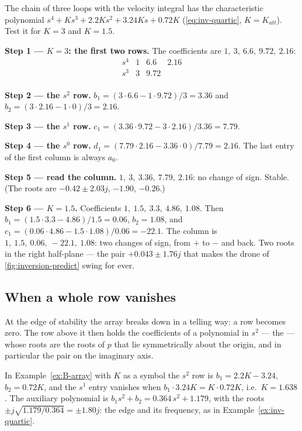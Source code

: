 \begin{example}
\label{ex:B-array}
The chain of three loops with the velocity integral has the characteristic polynomial $s^4 + K s^3 + 2.2K s^2 + 3.24K s + 0.72K$ (\cref{eq:inv-quartic}, $K = K_{att}$). Test it for $K = 3$ and $K = 1.5$.

\textbf{Step 1 — $K = 3$: the first two rows.} The coefficients are $1,\ 3,\ 6.6,\ 9.72,\ 2.16$:
\begin{equation*}
\begin{array}{c|ccc}
  s^4 & 1 & 6.6 & 2.16\\
  s^3 & 3 & 9.72 & \\
\end{array}
\end{equation*}

\textbf{Step 2 — the $s^2$ row.} $b_1 = (3 \cdot 6.6 - 1 \cdot 9.72)/3 = 3.36$ and $b_2 = (3 \cdot 2.16 - 1 \cdot 0)/3 = 2.16$.

\textbf{Step 3 — the $s^1$ row.} $c_1 = (3.36 \cdot 9.72 - 3 \cdot 2.16)/3.36 = 7.79$.

\textbf{Step 4 — the $s^0$ row.} $d_1 = (7.79 \cdot 2.16 - 3.36 \cdot 0)/7.79 = 2.16$. The last entry of the first column is always $a_0$.

\textbf{Step 5 — read the column.} $1,\ 3,\ 3.36,\ 7.79,\ 2.16$: no change of sign. Stable. (The roots are $-0.42 \pm 2.03j$, $-1.90$, $-0.26$.)

\textbf{Step 6 — $K = 1.5$.} Coefficients $1,\ 1.5,\ 3.3,\ 4.86,\ 1.08$. Then $b_1 = (1.5 \cdot 3.3 - 4.86)/1.5 = 0.06$, $b_2 = 1.08$, and $c_1 = (0.06 \cdot 4.86 - 1.5 \cdot 1.08)/0.06 = -22.1$. The column is $1,\ 1.5,\ 0.06,\ -22.1,\ 1.08$: two changes of sign, from $+$ to $-$ and back. Two roots in the right half-plane — the pair $+0.043 \pm 1.76j$ that makes the drone of \cref{fig:inversion-predict} swing for ever.
\end{example}

\subsection{When a whole row vanishes}
At the edge of stability the array breaks down in a telling way: a row becomes zero. The row above it then holds the coefficients of a polynomial in $s^2$ — the  — whose roots are the roots of $p$ that lie symmetrically about the origin, and in particular the pair on the imaginary axis.

In Example~\ref{ex:B-array} with $K$ as a symbol the $s^2$ row is $b_1 = 2.2K - 3.24$, $b_2 = 0.72K$, and the $s^1$ entry vanishes when $b_1 \cdot 3.24K = K \cdot 0.72K$, i.e.\ $K = 1.638$. The auxiliary polynomial is $b_1 s^2 + b_2 = 0.364\,s^2 + 1.179$, with the roots $\pm j\sqrt{1.179/0.364} = \pm 1.80j$: the edge and its frequency, as in Example~\ref{ex:inv-quartic}.

